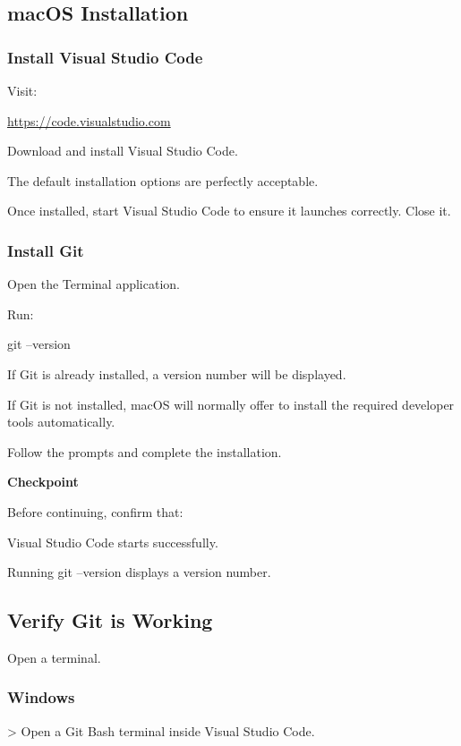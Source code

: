 \documentclass{csc2059practical}
\begin{document}
\subsection{macOS Installation}
\subsubsection{Install Visual Studio Code}
Visit:

\href{https://code.visualstudio.com}{https://code.visualstudio.com}

Download and install Visual Studio Code.

The default installation options are perfectly acceptable.

Once installed, start Visual Studio Code to ensure it launches correctly. Close it.

\subsubsection{Install Git}
Open the Terminal application.

Run:

\begin{terminalplain}
git --version
\end{terminalplain}
If Git is already installed, a version number will be displayed.

If Git is not installed, macOS will normally offer to install the required developer tools automatically.

Follow the prompts and complete the installation.

\begin{reflectionbox}
\textbf{Checkpoint}\par
\medskip

Before continuing, confirm that:


Visual Studio Code starts successfully.


Running git --version displays a version number.


\end{reflectionbox}
\subsection{Verify Git is Working}
Open a terminal.

\subsubsection{Windows}
> Open a Git Bash terminal inside Visual Studio Code.
\end{document}
